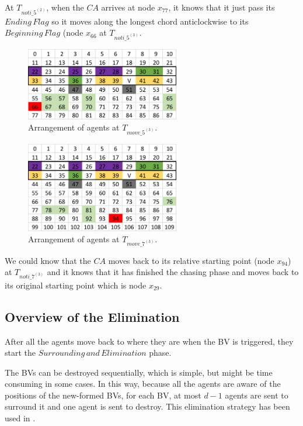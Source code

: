 At $T_{noti\_5^{(2)}}$, when the $CA$ arrives at node $x_{77}$, it knows that it just pass its $Ending\,Flag$ so it moves along the longest chord anticlockwise to its $Beginning\,Flag$ (node $x_{66}$ at $T_{noti\_5^{(3)}}$.
\begin{figure}[H]
  \centering  
  \includegraphics[width=0.6\textwidth]{figures/T66.png}
  \caption{Arrangement of agents at $T_{move\_5^{(3)}}$. }\label{fig:T66}
\end{figure}

\begin{figure}[H]
  \centering  
  \includegraphics[width=0.6\textwidth]{figures/T94.png}
  \caption{Arrangement of agents at $T_{move\_7^{(3)}}$. }\label{fig:T94}
\end{figure}

We could know that the $CA$ moves back to its relative starting point (node $x_{94}$) at $T_{noti\_7^{(3)}}$ and it knows that it has finished the chasing phase and moves back to its original starting point which is node $x_{29}$.


\subsection{Overview of the Elimination}
After all the agents move back to where they are when the BV is triggered, they start the $Surrounding\,and\,Elimination$ phase. 

The BVs can be destroyed sequentially,  which is simple,  but might be time consuming in some cases. In this way, because all the agents are aware of the positions of the new-formed BVs,   for each BV,  at most $d-1$ agents are sent to surround it  and one agent is sent to destroy. This elimination strategy has been used in \cite{alotaibi}. 

